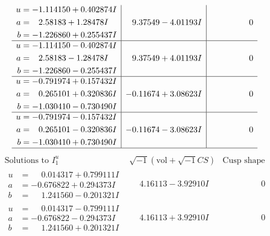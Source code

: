 \documentclass[1p]{elsarticle_modified}
\theoremstyle{definition}
\newcommand{\I}{\sqrt{-1}}
\begin{document}
$$\begin{array}{c|c|c}
\begin{aligned}
u &= -1.114150 + 0.402874 I \\
a &= \phantom{-}2.58183 + 1.28478 I \\
b &= -1.226860 + 0.255437 I\end{aligned}
 & \phantom{-}9.37549 - 4.01193 I & \phantom{-0.000000 } 0 \\ \hline\begin{aligned}
u &= -1.114150 - 0.402874 I \\
a &= \phantom{-}2.58183 - 1.28478 I \\
b &= -1.226860 - 0.255437 I\end{aligned}
 & \phantom{-}9.37549 + 4.01193 I & \phantom{-0.000000 } 0 \\ \hline\begin{aligned}
u &= -0.791974 + 0.157432 I \\
a &= \phantom{-}0.265101 + 0.320836 I \\
b &= -1.030410 - 0.730490 I\end{aligned}
 & -0.11674 + 3.08623 I & \phantom{-0.000000 } 0 \\ \hline\begin{aligned}
u &= -0.791974 - 0.157432 I \\
a &= \phantom{-}0.265101 - 0.320836 I \\
b &= -1.030410 + 0.730490 I\end{aligned}
 & -0.11674 - 3.08623 I & \phantom{-0.000000 } 0\\
 \hline 
 \end{array}$$\newpage$$\begin{array}{c|c|c}  
\text{Solutions to }I^u_{1}& \I (\text{vol} + \sqrt{-1}CS) & \text{Cusp shape}\\
 \hline 
\begin{aligned}
u &= \phantom{-}0.014317 + 0.799111 I \\
a &= -0.676822 + 0.294373 I \\
b &= \phantom{-}1.241560 - 0.201321 I\end{aligned}
 & \phantom{-}4.16113 - 3.92910 I & \phantom{-0.000000 } 0 \\ \hline\begin{aligned}
u &= \phantom{-}0.014317 - 0.799111 I \\
a &= -0.676822 - 0.294373 I \\
b &= \phantom{-}1.241560 + 0.201321 I\end{aligned}
 & \phantom{-}4.16113 + 3.92910 I & \phantom{-0.000000 } 0 \\ \hline\begin{aligned}

\end{aligned}
\end{array}$$
\end{document}
